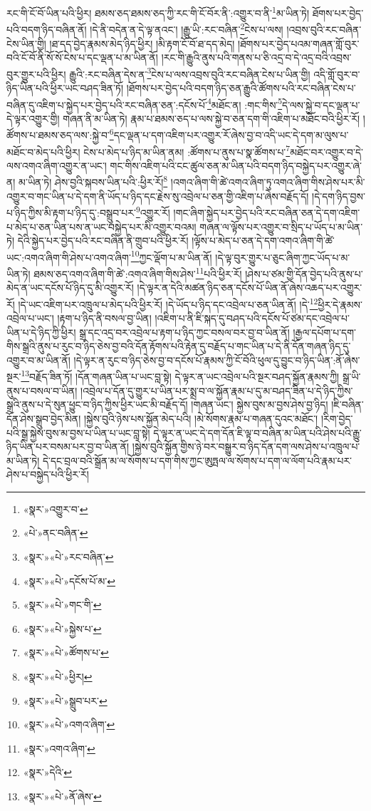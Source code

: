 རང་གི་ངོ་བོ་ཡིན་པའི་ཕྱིར། ཐམས་ཅད་ཐམས་ཅད་ཀྱི་རང་གི་ངོ་བོར་ནི་:འགྱུར་བ་ནི་\footnote{«སྣར་»འགྱུར་བ་}མ་ཡིན་ཏེ། ཐོགས་པར་བྱེད་པའི་བདག་ཉིད་བཞིན་ནོ། །དེ་ནི་བདེན་ན་དེ་ལྟ་ནའང་། །རྒྱུ་ཡི་:རང་བཞིན་\footnote{«པེ་»ནང་བཞིན་}ངེས་པ་ལས། །འབྲས་བུའི་རང་བཞིན་ངེས་ཡིན་གྱི། །ཐ་དད་བྱེད་རྣམས་མེད་ཉིད་ཕྱིར། །མི་རྟག་ངོ་བོ་ཐ་དད་མེད། །ཐོགས་པར་བྱེད་པའམ་གཞན་གློ་བུར་བའི་ངོ་བོ་ནི་སོ་སོ་ངེས་པ་དང་ལྡན་པ་མ་ཡིན་ནོ། །རང་གི་རྒྱུའི་ནུས་པའི་གནས་པ་ཅི་འདྲ་བ་དེ་འདྲ་བའི་འབྲས་བུར་གྱུར་པའི་ཕྱིར། རྒྱུའི་:རང་བཞིན་དེས་ན་\footnote{«སྣར་»«པེ་»རང་བཞིན་}ངེས་པ་ལས་འབྲས་བུའི་རང་བཞིན་ངེས་པ་ཡིན་གྱི། འདི་གློ་བུར་བ་ཉིད་ཡིན་པའི་ཕྱིར་ཡང་བཤད་ཟིན་ཏོ། །ཐོགས་པར་བྱེད་པའི་བདག་ཉིད་ཅན་རྒྱུའི་ཚོགས་པའི་རང་བཞིན་ངེས་པ་བཞིན་དུ་འཇིག་པ་སྐྱེད་པར་བྱེད་པའི་རང་བཞིན་ཅན་:དངོས་པོ་\footnote{«སྣར་»«པེ་»དངོས་པོ་མ་}མཐོང་ན། :གང་གིས་\footnote{«སྣར་»«པེ་»གང་གི་}དེ་ལས་སྐྱེ་བ་དང་ལྡན་པ་དེ་ལྟར་འགྱུར་གྱི། གཞན་ནི་མ་ཡིན་ཏེ། རྣམ་པ་ཐམས་ཅད་པ་ལས་སྐྱེ་བ་ཅན་དག་གི་འཇིག་པ་མཐོང་བའི་ཕྱིར་རོ། །ཚོགས་པ་ཐམས་ཅད་ལས་:སྐྱེ་བ་\footnote{«སྣར་»«པེ་»སྐྱེས་པ་}དང་ལྡན་པ་དག་འཇིག་པར་འགྱུར་རོ་ཞེས་བྱ་བ་འདི་ཡང་དེ་དག་མ་ལུས་པ་མཐོང་བ་མེད་པའི་ཕྱིར། ངེས་པ་མེད་པ་ཉིད་མ་ཡིན་ནམ། :ཚོགས་པ་ནུས་པ་སྣ་ཚོགས་པ་\footnote{«སྣར་»«པེ་»ཚོགས་པ་}མཐོང་བར་འགྱུར་བ་དེ་ལས་འགའ་ཞིག་འགྱུར་ན་ཡང་། གང་གིས་འཇིག་པའི་ངང་ཚུལ་ཅན་མ་ཡིན་པའི་བདག་ཉིད་བསྐྱེད་པར་འགྱུར་ཞེ་ན། མ་ཡིན་ཏེ། ཤེས་བྱའི་སྐབས་ཡིན་པའི་:ཕྱིར་རོ།\footnote{«སྣར་»«པེ་»ཕྱིར།} །འགའ་ཞིག་གི་ཚེ་འགའ་ཞིག་ཏུ་འགའ་ཞིག་གིས་ཤེས་པར་མི་འགྱུར་བ་གང་ཡིན་པ་དེ་དག་ནི་ཡོད་པ་ཉིད་དང་རྗེས་སུ་འབྲེལ་པ་ཅན་གྱི་འཇིག་པ་ཞེས་བརྗོད་དོ། །དེ་དག་ཉིད་བྱས་པ་ཉིད་ཀྱིས་མི་རྟག་པ་ཉིད་དུ་:བསྒྲུབ་པར་\footnote{«སྣར་»«པེ་»སྒྲུབ་པར་}འགྱུར་རོ། །གང་ཞིག་སྐྱེད་པར་བྱེད་པའི་རང་བཞིན་ཅན་དེ་དག་འཇིག་པ་མེད་པ་ཅན་ཡིན་པས་ན་ཡང་བསྐྱེད་པར་མི་འགྱུར་བའམ། གཞན་ལ་ལྟོས་པར་འགྱུར་བ་སྲིད་པ་ཡོད་པ་མ་ཡིན་ཏེ། དེའི་སྐྱེད་པར་བྱེད་པའི་རང་བཞིན་ནི་གྲུབ་པའི་ཕྱིར་རོ། །ལྟོས་པ་མེད་པ་ཅན་དེ་དག་འགའ་ཞིག་གི་ཚེ་ཡང་:འགའ་ཞིག་གི་ཤེས་པ་འགའ་ཞིག་\footnote{«སྣར་»«པེ་»འགའ་ཞིག་}ཀྱང་ལྡོག་པ་མ་ཡིན་ནོ། །དེ་ལྟ་བུར་གྱུར་པ་ཅུང་ཞིག་ཀྱང་ཡོད་པ་མ་ཡིན་ཏེ། ཐམས་ཅད་འགའ་ཞིག་གི་ཚེ་:འགའ་ཞིག་གིས་ཤེས་\footnote{«སྣར་»འགའ་ཞིག་}པའི་ཕྱིར་རོ། །ཤེས་པ་ཙམ་གྱི་དོན་བྱེད་པའི་ནུས་པ་མེད་ན་ཡང་དངོས་པོ་ཉིད་དུ་མི་འགྱུར་རོ། །དེ་ལྟར་ན་དེའི་མཚན་ཉིད་ཅན་དངོས་པོ་ཡིན་ནོ་ཞེས་འཆད་པར་འགྱུར་རོ། །དེ་ཡང་འཇིག་པར་འཁྲུལ་པ་མེད་པའི་ཕྱིར་རོ། །དེ་ཡོད་པ་ཉིད་དང་འབྲེལ་པ་ཅན་ཡིན་ནོ། །དེ་\footnote{«སྣར་»དེའི་}ཕྱིར་དེ་རྣམས་འབྲེལ་པ་ཡང་། །རྟག་པ་ཉིད་ནི་བསལ་བྱ་ཡིན། །འཇིག་པ་ནི་ཇི་སྐད་དུ་བཤད་པའི་དངོས་པོ་ཙམ་དང་འབྲེལ་པ་ཡིན་པ་དེ་ཉིད་ཀྱི་ཕྱིར། སྒྲ་དང་འདྲ་བར་འབྲེལ་པ་རྟག་པ་ཉིད་ཀྱང་བསལ་བར་བྱ་བ་ཡིན་ནོ། །རྒྱལ་དཔོག་པ་དག་གིས་སྒྲའི་ནུས་པ་རུང་བ་ཉིད་ཅེས་བྱ་བའི་དོན་རྟོགས་པའི་རྟེན་དུ་བརྗོད་པ་གང་ཡིན་པ་དེ་ནི་དོན་གཞན་ཉིད་དུ་འགྱུར་བ་མ་ཡིན་ནོ། །དེ་ལྟར་ན་རུང་བ་ཉིད་ཅེས་བྱ་བ་དངོས་པོ་རྣམས་ཀྱི་ངོ་བོའི་ཕུལ་དུ་བྱུང་བ་ཉིད་ཡིན་:ནོ་ཞེས་སྔར་\footnote{«སྣར་»«པེ་»ནོ་ཞེས་}བརྗོད་ཟིན་ཏོ། །དོན་གཞན་ཡིན་པ་ཡང་བླ་སྟེ། དེ་ལྟར་ན་ཡང་འབྲེལ་པའི་སྔར་བཤད་སྐྱོན་རྣམས་ཀྱི། སྒྲ་ཡི་ནུས་པ་བསལ་བ་ཡིན། །འབྲེལ་པ་དོན་དུ་གྱུར་པ་ཡིན་པར་སྨྲ་བ་ལ་སྐྱོན་རྣམ་པ་དུ་མ་བཤད་ཟིན་པ་དེ་ཉིད་ཀྱིས་སྒྲའི་ནུས་པ་དེ་སུན་ཕྱུང་བ་ཉིད་ཀྱིས་ཕྱིར་ཡང་མི་བརྗོད་དོ། །གཞན་ཡང་། སྐྱེས་བུས་མ་བྱས་ཤེས་བྱ་ཉིད། །ཇི་བཞིན་དོན་ཤེས་སྒྲུབ་བྱེད་མིན། །སྐྱེས་བུའི་ཉེས་པས་སྐྱོན་མེད་པའི། །མེ་སོགས་རྣམ་པ་གཞན་དུའང་མཐོང་། །རིག་བྱེད་པའི་སྒྲ་སྐྱེས་བུས་མ་བྱས་པ་ཡིན་པ་ཡང་བླ་སྟེ། དེ་ལྟར་ན་ཡང་དེ་དག་དོན་ཇི་ལྟ་བ་བཞིན་མ་ཡིན་པའི་ཤེས་པའི་རྒྱུ་ཉིད་ཡིན་པར་བསམ་པར་བྱ་བ་ཡིན་ནོ། །སྐྱེས་བུའི་སྐྱོན་གྱིས་ཉེ་བར་བསྒྱུར་བ་ཉིད་དོན་དག་ལས་ཤེས་པ་འཁྲུལ་པ་མ་ཡིན་ཏེ། དེ་དང་བྲལ་བའི་སྒྲོན་མ་ལ་སོགས་པ་དག་གིས་ཀྱང་ཨུཏྤལ་ལ་སོགས་པ་དག་ལ་ལོག་པའི་རྣམ་པར་ཤེས་པ་བསྐྱེད་པའི་ཕྱིར་རོ། 
